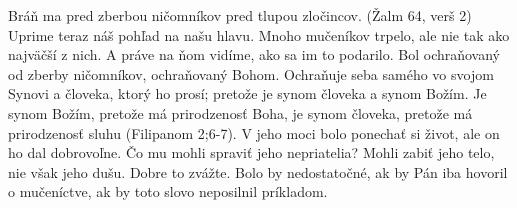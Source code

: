 Bráň ma pred zberbou ničomníkov 
pred tlupou zločincov. (Žalm 64, verš 2)
Uprime teraz náš pohľad na našu hlavu.
Mnoho mučeníkov trpelo, ale nie tak ako najväčší z nich.
A práve na ňom vidíme, ako sa im to podarilo.
Bol ochraňovaný od zberby ničomníkov, ochraňovaný Bohom.
Ochraňuje seba samého vo svojom Synovi a človeka, ktorý ho prosí; pretože je synom človeka a synom Božím. Je synom Božím, pretože má prirodzenosť Boha, je synom človeka, pretože má prirodzenosť sluhu (Filipanom 2;6-7). 
V jeho moci bolo ponechať si život, ale on ho dal dobrovoľne.
Čo mu mohli spraviť jeho nepriatelia?
Mohli zabiť jeho telo, nie však jeho dušu. Dobre to zvážte.
Bolo by nedostatočné, ak by Pán iba hovoril o mučeníctve, ak by toto slovo neposilnil príkladom.